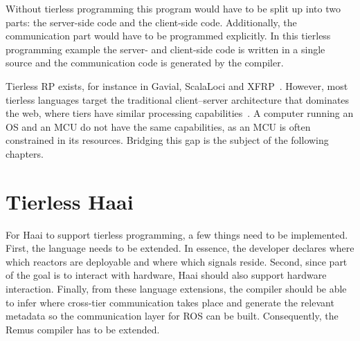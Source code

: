 \documentclass[a4paper]{book}
\begin{document}
\par
Without tierless programming this program would have to be split up into two
parts: the server-side code and the client-side code. Additionally, the
communication part would have to be programmed explicitly. In this tierless
programming example the server- and client-side code is written in a single
source and the communication code is generated by the compiler.
\par
Tierless RP exists, for instance in Gavial, ScalaLoci and XFRP~\cite{surveyRP2024}.
However, most tierless languages target the traditional client--server
architecture that dominates the web, where tiers have similar processing
capabilities~\cite{weisenburger2020survey}. A computer running an OS and an MCU
do not have the same capabilities, as an MCU is often constrained in its
resources. Bridging this gap is the subject of the following chapters.
\chapter{Tierless Haai}
\label{ch:tierless-haai}
For Haai to support tierless programming, a few things need to be implemented.
First, the language needs to be extended. In essence, the developer declares where which reactors are deployable and where which
signals reside. Second, since part of the goal is to interact with hardware,
Haai should also support hardware interaction.
Finally, from these language extensions, the compiler should be able to
infer where cross-tier communication takes place and generate the relevant metadata so the communication layer for ROS can be built. Consequently, the Remus
compiler has to be extended.
\end{document}
